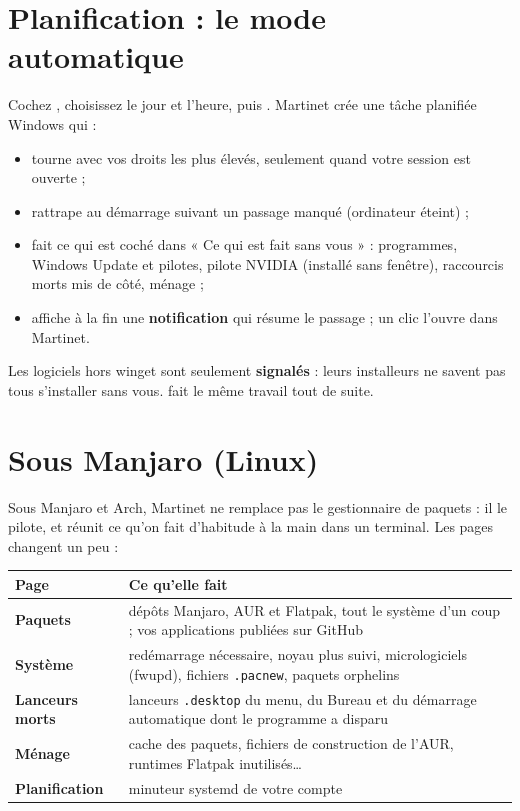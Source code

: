 \section{Planification : le mode automatique}\label{sec:planif}


Cochez , choisissez le jour et l'heure, puis . Martinet
crée une tâche planifiée Windows qui :
\begin{itemize}
\item tourne avec vos droits les plus élevés, seulement quand votre session est ouverte ;
\item rattrape au démarrage suivant un passage manqué (ordinateur éteint) ;
\item fait ce qui est coché dans « Ce qui est fait sans vous » : programmes, Windows Update et pilotes,
pilote NVIDIA (installé sans fenêtre), raccourcis morts mis de côté, ménage ;
\item affiche à la fin une \textbf{notification} qui résume le passage ; un clic l'ouvre dans Martinet.
\end{itemize}

Les logiciels hors winget sont seulement \textbf{signalés} : leurs installeurs ne savent pas tous
s'installer sans vous.  fait le même travail tout de suite.

\section{Sous Manjaro (Linux)}\label{sec:linux}


Sous Manjaro et Arch, Martinet ne remplace pas le gestionnaire de paquets : il le pilote, et réunit
ce qu'on fait d'habitude à la main dans un terminal. Les pages changent un peu :

\begin{center}
\renewcommand{\arraystretch}{1.35}
\begin{tabularx}{\linewidth}{>{\sffamily\bfseries\color{bordeaux}}l >{\raggedright\arraybackslash}X}
\toprule
\textbf{\color{ink}Page} & \textbf{Ce qu'elle fait} \\
\midrule
Paquets & dépôts Manjaro, AUR et Flatpak, tout le système d'un coup ; vos applications publiées sur GitHub \\
Système & redémarrage nécessaire, noyau plus suivi, micrologiciels (fwupd), fichiers \texttt{.pacnew}, paquets orphelins \\
Lanceurs morts & lanceurs \texttt{.desktop} du menu, du Bureau et du démarrage automatique dont le programme a disparu \\
Ménage & cache des paquets, fichiers de construction de l'AUR, runtimes Flatpak inutilisés… \\
Planification & minuteur systemd de votre compte \\
\bottomrule
\end{tabularx}
\end{center}


